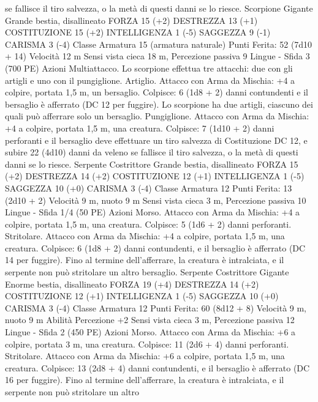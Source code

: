 \begin{multicols}{2}
se fallisce il tiro salvezza, o la metà di questi danni se lo riesce.
Scorpione Gigante
Grande bestia, disallineato
FORZA 15 (+2)
DESTREZZA 13 (+1)
COSTITUZIONE 15 (+2)
INTELLIGENZA 1 (-5)
SAGGEZZA 9 (-1)
CARISMA 3 (-4)
Classe Armatura 15 (armatura naturale)
\hspace*{0pt}\hfill{Punti Ferita}: 52 (7d10 + 14)
Velocità 12 m
Sensi vista cieca 18 m, Percezione passiva 9
Lingue -
Sfida 3 (700 PE)
Azioni
Multiattacco. Lo scorpione effettua tre attacchi: due con gli
artigli e uno con il pungiglione.
Artiglio. Attacco con Arma da Mischia: +4 a colpire, portata 1,5
m, un bersaglio.
Colpisce: 6 (1d8 + 2) danni contundenti e il bersaglio è afferrato
(DC 12 per fuggire). Lo scorpione ha due artigli, ciascuno dei
quali può afferrare solo un bersaglio.
Pungiglione. Attacco con Arma da Mischia: +4 a colpire, portata
1,5 m, una creatura.
Colpisce: 7 (1d10 + 2) danni perforanti e il bersaglio deve
effettuare un tiro salvezza di Costituzione DC 12, e subire 22
(4d10) danni da veleno se fallisce il tiro salvezza, o la metà di
questi danni se lo riesce.
Serpente Costrittore
Grande bestia, disallineato
FORZA 15 (+2)
DESTREZZA 14 (+2)
COSTITUZIONE 12 (+1)
INTELLIGENZA 1 (-5)
SAGGEZZA 10 (+0)
CARISMA 3 (-4)
Classe Armatura 12
\hspace*{0pt}\hfill{Punti Ferita}: 13 (2d10 + 2)
Velocità 9 m, nuoto 9 m
Sensi vista cieca 3 m, Percezione passiva 10
Lingue -
Sfida 1/4 (50 PE)
Azioni
Morso. Attacco con Arma da Mischia: +4 a colpire, portata 1,5
m, una creatura.
Colpisce: 5 (1d6 + 2) danni perforanti.
Stritolare. Attacco con Arma da Mischia: +4 a colpire, portata
1,5 m, una creatura.
Colpisce: 6 (1d8 + 2) danni contundenti, e il bersaglio è afferrato
(DC 14 per fuggire). Fino al termine dell’afferrare, la creatura è
intralciata, e il serpente non può stritolare un altro bersaglio.
Serpente Costrittore
Gigante
Enorme bestia, disallineato
FORZA 19 (+4)
DESTREZZA 14 (+2)
COSTITUZIONE 12 (+1)
INTELLIGENZA 1 (-5)
SAGGEZZA 10 (+0)
CARISMA 3 (-4)
Classe Armatura 12
\hspace*{0pt}\hfill{Punti Ferita}: 60 (8d12 + 8)
Velocità 9 m, nuoto 9 m
Abilità Percezione +2
Sensi vista cieca 3 m, Percezione passiva 12
Lingue -
Sfida 2 (450 PE)
Azioni
Morso. Attacco con Arma da Mischia: +6 a colpire, portata 3 m,
una creatura.
Colpisce: 11 (2d6 + 4) danni perforanti.
Stritolare. Attacco con Arma da Mischia: +6 a colpire, portata
1,5 m, una creatura.
Colpisce: 13 (2d8 + 4) danni contundenti, e il bersaglio è
afferrato (DC 16 per fuggire). Fino al termine dell’afferrare, la
creatura è intralciata, e il serpente non può stritolare un altro

\end{multicols}
